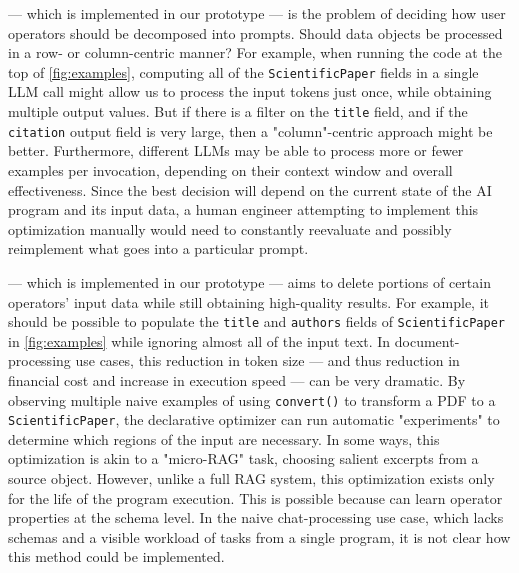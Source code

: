  --- which is implemented in our prototype --- is the problem of deciding how user operators should be decomposed into prompts. Should data objects be processed in a row- or column-centric manner? For example, when running the code at the top of \autoref{fig:examples}, computing all of the {\tt ScientificPaper} fields in a single LLM call might allow us to process the input tokens just once, while obtaining multiple output values. But if there is a filter on the {\tt title} field, and if the {\tt citation} output field is very large, then a "column"-centric approach might be better.  Furthermore, different LLMs may be able to process more or fewer examples per invocation, depending on their context window and overall effectiveness.
Since the best decision will depend on the current state of the AI program and its input data, a human engineer attempting to implement this optimization manually would need to constantly reevaluate and possibly reimplement what goes into a particular prompt. 

 --- which is implemented in our prototype --- aims to delete portions of certain operators' input data while still obtaining high-quality results. For example, it should be possible to populate the {\tt title} and {\tt authors} fields of {\tt ScientificPaper} in \autoref{fig:examples} while ignoring almost all of the input text.  In document-processing use cases, this reduction in token size --- and thus reduction in financial cost and increase in execution speed --- can be very dramatic. By observing multiple naive examples of using {\tt convert()}  to transform a PDF to a {\tt ScientificPaper}, the declarative optimizer can run automatic "experiments" to determine which regions of the input are necessary. 
In some ways, this optimization is akin to a "micro-RAG" task, choosing salient excerpts from a source object. However, unlike a full RAG system, this optimization exists only for the life of the program execution. This is possible because \system{} can learn operator properties at the schema level. In the naive chat-processing use case, which lacks schemas and a visible workload of tasks from a single program, it is not clear how this method could be implemented. 

